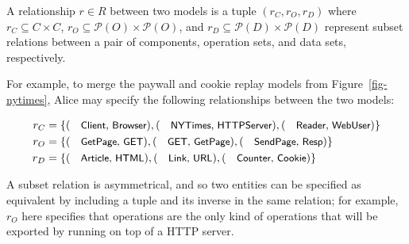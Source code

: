 \begin{defn} A relationship $r \in R$ between two models is a tuple
  $(r_{C}, r_{O}, r_{D})$ where $r_{C} \subseteq C \times C$, $r_{O}
  \subseteq \mathcal P (O) \times \mathcal P (O)$, and $r_{D}
  \subseteq \mathcal P (D) \times \mathcal P (D)$ represent subset
  relations between a pair of components, operation sets, and data
  sets, respectively.
\end{defn}
For example, to merge the paywall and cookie replay models from
Figure~\ref{fig-nytimes}, Alice may specify the following
relationships between the two models:
\begin{scriptsize}
\begin{align*}
  r_{C} = \{&(\txtcname{Client$,$ Browser}),(\txtcname{NYTimes$,$
    HTTPServer}), (\txtcname{Reader$,$
    WebUser})\} \\
  r_{O} = \{&(\txtcname{GetPage$,$ GET}), (\txtcname{GET$,$ GetPage}),
  (\txtcname{SendPage$,$
    Resp})\}\\
  r_{D} = \{&(\txtcname{Article$,$ HTML}),(\txtcname{Link$,$ URL}),
  (\txtcname{Counter$,$ Cookie})\}
\end{align*}
\end{scriptsize}
A subset relation is asymmetrical, and so two entities can be
specified as equivalent by including a tuple and its inverse in the
same relation; for example, $r_{O}$ here specifies that
 operations are the only kind of 
operations that will be exported by  running on top of
a HTTP server.


